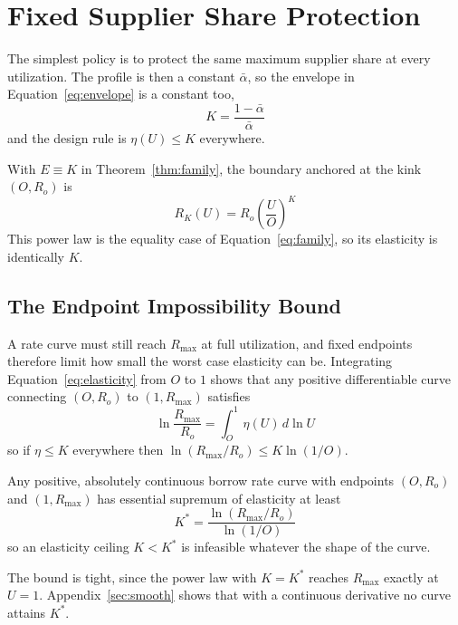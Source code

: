 \documentclass[11pt,a4paper]{article}
\begin{document}
\section{Fixed Supplier Share Protection}
\label{sec:fixed}

The simplest policy is to protect the same maximum supplier share at every utilization. The profile is then a constant $\bar\alpha$, so the envelope in Equation~\ref{eq:envelope} is a constant too,
\begin{equation}
\boxed{
K=\frac{1-\bar\alpha}{\bar\alpha}
}
\end{equation}
and the design rule is $\eta(U)\leq K$ everywhere.

With $E\equiv K$ in Theorem~\ref{thm:family}, the boundary anchored at the kink $(O,R_o)$ is
\begin{equation}
\boxed{
R_K(U)=R_o\left(\frac{U}{O}\right)^K
}
\end{equation}
This power law is the equality case of Equation~\ref{eq:family}, so its elasticity is identically $K$.

\subsection{The Endpoint Impossibility Bound}
\label{sec:endpoint}

A rate curve must still reach $R_{\max}$ at full utilization, and fixed endpoints therefore limit how small the worst case elasticity can be. Integrating Equation~\ref{eq:elasticity} from $O$ to $1$ shows that any positive differentiable curve connecting $(O,R_o)$ to $(1,R_{\max})$ satisfies
\begin{equation}
\ln\frac{R_{\max}}{R_o}
=\int_O^1 \eta(U)\,d\ln U
\label{eq:endpoint}
\end{equation}
so if $\eta\leq K$ everywhere then $\ln(R_{\max}/R_o)\leq K\ln(1/O)$.

\begin{theorem}
\label{thm:kstar}
Any positive, absolutely continuous borrow rate curve with endpoints $(O,R_o)$ and $(1,R_{\max})$ has essential supremum of elasticity at least
\begin{equation}
\boxed{
K^*=\frac{\ln(R_{\max}/R_o)}{\ln(1/O)}
}
\end{equation}
so an elasticity ceiling $K<K^*$ is infeasible whatever the shape of the curve.
\end{theorem}

The bound is tight, since the power law with $K=K^*$ reaches $R_{\max}$ exactly at $U=1$. Appendix~\ref{sec:smooth} shows that with a continuous derivative no curve attains $K^*$.
\end{document}
